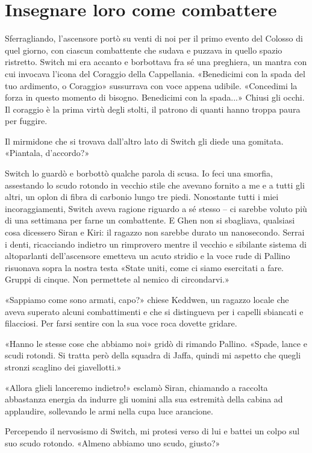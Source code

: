 \chapter{Insegnare loro come combattere}

Sferragliando, l'ascensore portò su venti di noi per il primo evento del
Colosso di quel giorno, con ciascun combattente che sudava e puzzava in
quello spazio ristretto. Switch mi era accanto e borbottava fra sé una
preghiera, un mantra con cui invocava l'icona del Coraggio della
Cappellania. «Benedicimi con la spada del tuo ardimento, o Coraggio»
sussurrava con voce appena udibile. «Concedimi la forza in questo
momento di bisogno. Benedicimi con la spada...» Chiusi gli occhi. Il
coraggio è la prima virtù degli stolti, il patrono di quanti hanno
troppa paura per fuggire.

Il mirmidone che si trovava dall'altro lato di Switch gli diede una
gomitata. «Piantala, d'accordo?»

Switch lo guardò e borbottò qualche parola di scusa. Io feci una
smorfia, assestando lo scudo rotondo in vecchio stile che avevano
fornito a me e a tutti gli altri, un oplon di fibra di carbonio lungo
tre piedi. Nonostante tutti i miei incoraggiamenti, Switch aveva ragione
riguardo a sé stesso -- ci sarebbe voluto più di una settimana per farne
un combattente. E Ghen non si sbagliava, qualsiasi cosa dicessero Siran
e Kiri: il ragazzo non sarebbe durato un nanosecondo. Serrai i denti,
ricacciando indietro un rimprovero mentre il vecchio e sibilante sistema
di altoparlanti dell'ascensore emetteva un acuto stridio e la voce rude
di Pallino risuonava sopra la nostra testa «State uniti, come ci siamo
esercitati a fare. Gruppi di cinque. Non permettete al nemico di
circondarvi.»

«Sappiamo come sono armati, capo?» chiese Keddwen, un ragazzo locale che
aveva superato alcuni combattimenti e che si {distingueva} per i capelli
sbiancati e filacciosi. Per farsi sentire con la sua voce roca dovette
gridare.

«Hanno le stesse cose che abbiamo noi» gridò di rimando Pallino. «Spade,
lance e scudi rotondi. Si tratta però della squadra di Jaffa, quindi mi
aspetto che quegli stronzi scaglino dei giavellotti.»

«Allora glieli lanceremo indietro!» esclamò Siran, chiamando a raccolta
abbastanza energia da indurre gli uomini alla sua estremità della cabina
ad applaudire, sollevando le armi nella cupa luce arancione.

Percependo il nervosismo di Switch, mi protesi verso di lui e battei un
colpo sul suo scudo rotondo. «Almeno abbiamo uno scudo, giusto?»

